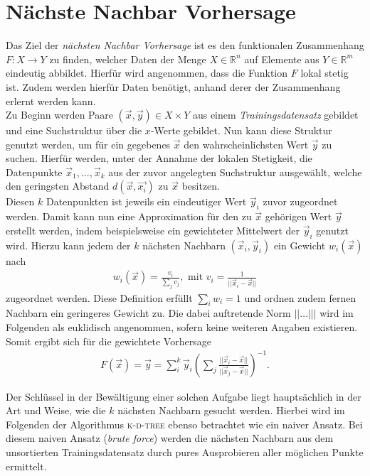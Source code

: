 \section{Nächste Nachbar Vorhersage}
Das Ziel der \textit{nächsten Nachbar Vorhersage} ist es den funktionalen Zusammenhang $F : X \rightarrow Y$ zu finden, welcher Daten der Menge $X \in \mathbb{R}^n$ auf Elemente aus $Y \in \mathbb{R}^m$ eindeutig abbildet. Hierfür wird angenommen, dass die Funktion $F$ lokal stetig ist. Zudem werden hierfür Daten benötigt, anhand derer der Zusammenhang erlernt werden kann.\\
Zu Beginn werden Paare $(\vec{x},\vec{y}) \in X \times Y$ aus einem \textit{Trainingsdatensatz} gebildet und eine Suchstruktur über die $x$-Werte gebildet. Nun kann diese Struktur genutzt werden, um für ein gegebenes $\vec{x}$ den wahrscheinlichsten Wert $\vec{y}$ zu suchen. Hierfür werden, unter der Annahme der lokalen Stetigkeit, die Datenpunkte $\vec{x}_1, ..., \vec{x}_k$ aus der zuvor angelegten Suchstruktur ausgewählt, welche den geringsten Abstand $d(\vec{x}, \vec{x_i})$ zu $\vec{x}$ besitzen.\\
Diesen $k$ Datenpunkten ist jeweils ein eindeutiger Wert $\vec{y}_i$ zuvor zugeordnet werden. Damit kann nun eine Approximation für den zu $\vec{x}$ gehörigen Wert $\vec{y}$ erstellt werden, indem beispielsweise ein gewichteter Mittelwert der $\vec{y}_i$ genutzt wird. Hierzu kann jedem der $k$ nächsten Nachbarn $(\vec{x}_i, \vec{y}_i)$ ein Gewicht $w_i(\vec{x})$ nach
\begin{align*}
w_i(\vec{x}) = \frac{v_i}{\sum_j v_j}, \text{ mit } v_i = \frac{1}{||\vec{x}_i-\vec{x}||} 
\end{align*}
zugeordnet werden. Diese Definition erfüllt $\sum_i w_i = 1$ und ordnen zudem fernen Nachbarn ein geringeres Gewicht zu. Die dabei auftretende Norm $||\ldots |||$ wird im Folgenden als euklidisch angenommen, sofern keine weiteren Angaben existieren. Somit ergibt sich für die gewichtete Vorhersage
\begin{align}
F(\vec{x}) = \vec{y} = \sum^k_i \vec{y}_i \left( \sum_j \frac{||\vec{x}_i-\vec{x}||}{||\vec{x}_j-\vec{x}||} \right) ^{-1}.
\end{align}

Der Schlüssel in der Bewältigung einer solchen Aufgabe liegt hauptsächlich in der Art und Weise, wie die $k$ nächsten Nachbarn gesucht werden. Hierbei wird im Folgenden der Algorithmus \textsc{k-d-tree} ebenso betrachtet wie ein naiver Ansatz. Bei diesem naiven Ansatz (\textit{brute force}) werden die nächsten Nachbarn aus dem unsortierten Trainingsdatensatz durch pures Ausprobieren aller möglichen Punkte ermittelt.

